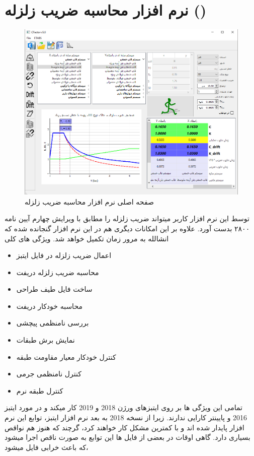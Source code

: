 \section{نرم افزار محاسبه ضریب زلزله ()}

\begin{figure}[H]
    \centering
    \includegraphics[scale=.6]{figures/cfactor}
    \caption{صفحه اصلی نرم افزار محاسبه ضریب زلزله}
\end{figure}
توسط این نرم افزار کاربر میتواند ضریب زلزله را مطابق با ویرایش چهارم آیین نامه ۲۸۰۰ بدست آورد. علاوه بر این امکانات دیگری هم در این نرم افزار گنجانده شده که انشالله به مرور زمان تکمیل خواهد شد. ویژگی های کلی

\begin{itemize}
    \item اعمال ضریب زلزله در فایل ایتبز
    \item محاسبه ضریب زلزله دریفت
    \item ساخت فایل طیف طراحی
    \item محاسبه خودکار دریفت
    \item بررسی نامنظمی پیچشی
    \item نمایش برش طبقات
    \item کنترل خودکار معیار مقاومت طبقه
    \item کنترل نامنظمی جرمی
    \item کنترل طبقه نرم
\end{itemize}

تمامی این ویژگی ها بر روی ایتبزهای ورژن 2018 و 2019 کار میکند و در مورد ایتبز 2016 و پایینتر کارایی ندارند. زیرا از نسخه 2018 به بعد نرم افزار ایتبز، 
توابع 
این نرم افزار پایدار شده اند و با کمترین مشکل کار خواهند کرد، گرچند که هنوز هم نواقص بسیاری دارد.
گاهی اوقات در بعضی از فایل ها این توابع به صورت ناقص اجرا میشود که باعث خرابی فایل میشود، 


